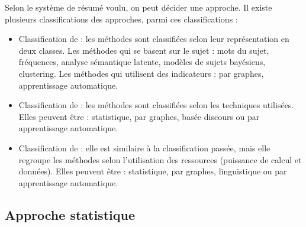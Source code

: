 \documentclass{KodeBook}
\begin{document}
Selon le système de résumé voulu, on peut décider une approche. 
Il existe plusieurs classifications des approches, parmi ces classifications :
\begin{itemize}
	\item Classification de \cite{12-nenkova-mckeown} : les méthodes sont classifiées selon leur représentation en deux classes.
	Les méthodes qui se basent sur le sujet : mots du sujet, fréquences, analyse sémantique latente, 
	modèles de sujets bayésiens, clustering.
	Les méthodes qui utilisent des indicateurs : par graphes, apprentissage automatique.
	\item Classification de \cite{12-lloret-palomar} : les méthodes sont classifiées selon les techniques utilisées.
	Elles peuvent être : statistique, par graphes, basée discours ou par apprentissage automatique.
	\item Classification de \cite{19-aries-al} : elle est similaire à la classification passée, mais elle regroupe les méthodes selon l'utilisation des ressources (puissance de calcul et données).
	Elles peuvent être : statistique, par graphes, linguistique ou par apprentissage automatique.
\end{itemize}

\subsection{Approche statistique}
\end{document}
